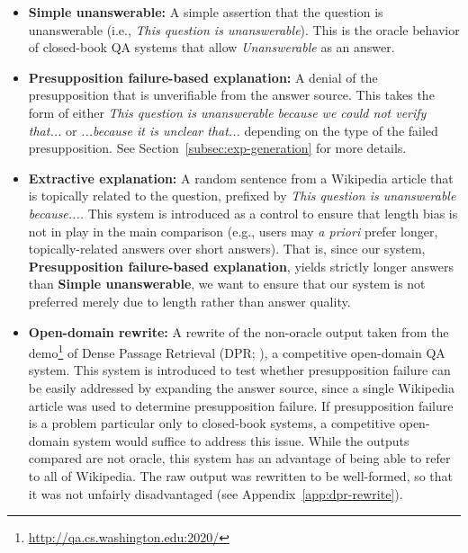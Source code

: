 \documentclass[11pt,a4paper]{article}
\begin{document}
\begin{itemize}
\itemsep -2pt
    \item \textbf{Simple unanswerable:} A simple assertion that the question is unanswerable (i.e., \textit{This question is unanswerable}). This is the oracle behavior of closed-book QA systems that allow \textit{Unanswerable} as an answer.
    \item \textbf{Presupposition failure-based explanation:} A denial of the presupposition that is unverifiable from the answer source. This takes the form of either \textit{This question is unanswerable because we could not verify that...} or \textit{...because it is unclear that...} depending on the type of the failed presupposition. See Section~\ref{subsec:exp-generation} for more details.    
    \item \textbf{Extractive explanation:} A random sentence from a Wikipedia article that is topically related to the question, prefixed by \textit{This question is unanswerable because....} This system is introduced as a control to ensure that length bias is not in play in the main comparison (e.g., users may \textit{a priori} prefer longer, topically-related answers over short answers). That is, since our system, \textbf{Presupposition failure-based explanation}, yields strictly longer answers than \textbf{Simple unanswerable}, we want to ensure that our system is not preferred merely due to length rather than answer quality.
    \item \textbf{Open-domain rewrite:} A rewrite of the non-oracle output taken from the demo\footnote{\url{http://qa.cs.washington.edu:2020/}} of Dense Passage Retrieval (DPR; \citealt{karpukhin2020dense}), a competitive open-domain QA system. This system is introduced to test whether presupposition failure can be easily addressed by expanding the answer source, since a single Wikipedia article was used to determine presupposition failure. If presupposition failure is a problem particular only to closed-book systems, a competitive open-domain system would suffice to address this issue. While the outputs compared are not oracle, this system has an advantage of being able to refer to all of Wikipedia. The raw output was rewritten to be well-formed, so that it was not unfairly disadvantaged (see Appendix~\ref{app:dpr-rewrite}).
\end{itemize}
\end{document}
